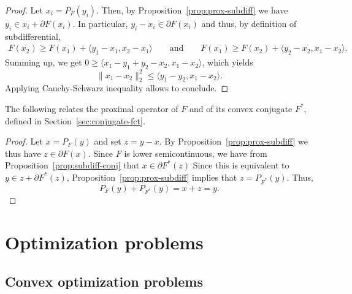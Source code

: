  \begin{proof}
     Let $x_i = P_F(y_i)$. Then, by Proposition~\ref{prop:prox-subdiff} we have $y_i \in x_i+\partial F(x_i)$. In particular, $y_i - x_i \in \partial F(x_i)$ and thus, by definition of subdifferential,
     \begin{gather}
         F(x_2) \ge F(x_1) + \langle y_1-x_1,x_2-x_1 \rangle
         \qquad\text{and}\qquad
         F(x_1) \ge F(x_2) + \langle y_2-x_2,x_1-x_2 \rangle .
     \end{gather}
     Summing up, we get $0\ge \langle x_1-y_1+y_2-x_2,x_1-x_2 \rangle$, which yields
     \begin{equation}
         \|x_1-x_2\|_2^2 \le \langle y_1-y_2,x_1-x_2\rangle.
     \end{equation}
     Applying Cauchy-Schwarz inequality allows to conclude.
 \end{proof}
 
 The following relates the proximal operator of $F$ and of its convex conjugate $F^*$, defined in Section~\ref{sec:conjugate-fct}.
 
 
 \begin{proof}
     Let $x = P_F(y)$ and set $z=y-x$. By Proposition~\ref{prop:prox-subdiff} we thus have $z\in \partial F(x)$. Since $F$ is lower semicontinuous, we have from Proposition~\ref{prop:subdiff-conj} that $x\in \partial F^*(z)$ Since this is equivalent to $y\in z + \partial F^*(z)$, Proposition~\ref{prop:prox-subdiff} implies that $z = P_{F^*}(y)$. Thus,
     \begin{equation}
         P_F(y) + P_{F^*}(y) = x + z = y.
     \end{equation}
 \end{proof}
 
 
 \chapter{Optimization problems}
 
 \section{Convex optimization problems}
 \label{chp:optimization-problems}
 
